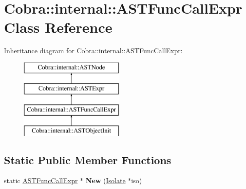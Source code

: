 \hypertarget{class_cobra_1_1internal_1_1_a_s_t_func_call_expr}{\section{Cobra\+:\+:internal\+:\+:A\+S\+T\+Func\+Call\+Expr Class Reference}
\label{class_cobra_1_1internal_1_1_a_s_t_func_call_expr}
}
Inheritance diagram for Cobra\+:\+:internal\+:\+:A\+S\+T\+Func\+Call\+Expr\+:\begin{figure}[H]
\begin{center}
\leavevmode
\includegraphics[height=4.000000cm]{class_cobra_1_1internal_1_1_a_s_t_func_call_expr}
\end{center}
\end{figure}
\subsection*{Static Public Member Functions}
\begin{DoxyCompactItemize}
\item 
\hypertarget{class_cobra_1_1internal_1_1_a_s_t_func_call_expr_a9f6e1c85f6869271a602a36d2a27e44c}{static \hyperlink{class_cobra_1_1internal_1_1_a_s_t_func_call_expr}{A\+S\+T\+Func\+Call\+Expr} $\ast$ {\bfseries New} (\hyperlink{class_cobra_1_1internal_1_1_isolate}{Isolate} $\ast$iso)}\label{class_cobra_1_1internal_1_1_a_s_t_func_call_expr_a9f6e1c85f6869271a602a36d2a27e44c}

\end{DoxyCompactItemize}
